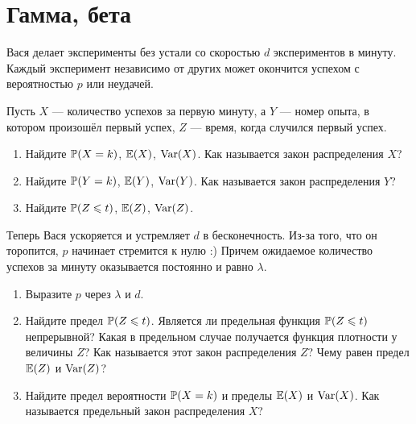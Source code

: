 \section{Гамма, бета}

\begin{problem}
Вася делает эксперименты без устали со скоростью $d$ экспериментов в минуту. Каждый эксперимент независимо от других может окончится успехом с вероятностью $p$ или неудачей.

Пусть $X$ — количество успехов за первую минуту, а $Y$ — номер опыта, в котором произошёл первый успех, $Z$ — время, когда случился первый успех.
\begin{enumerate}
\item Найдите $\P(X = k)$, $\E(X)$, $\Var(X)$. Как называется закон распределения $X$?
\item Найдите $\P(Y = k)$, $\E(Y)$, $\Var(Y)$. Как называется закон распределения $Y$?
\item Найдите $\P(Z \leq t)$, $\E(Z)$, $\Var(Z)$.
\end{enumerate}

Теперь Вася ускоряется и устремляет $d$ в бесконечность. Из-за того, что он торопится, $p$ начинает стремится к нулю :) Причем ожидаемое количество успехов за минуту оказывается постоянно и равно $\lambda$.

\begin{enumerate}[resume]
\item Выразите $p$ через $\lambda$ и $d$.
\item Найдите предел $\P(Z \leq t)$. Является ли предельная функция $\P(Z \leq t)$ непрерывной? Какая в предельном случае получается функция плотности у величины $Z$? Как называется этот закон распределения $Z$? Чему равен предел $\E(Z)$ и $\Var(Z)$?
\item Найдите предел вероятности $\P(X = k)$ и пределы $\E(X)$ и $\Var(X)$. Как называется предельный закон распределения $X$?
\end{enumerate}
\begin{sol}
\end{sol}
\end{problem}

